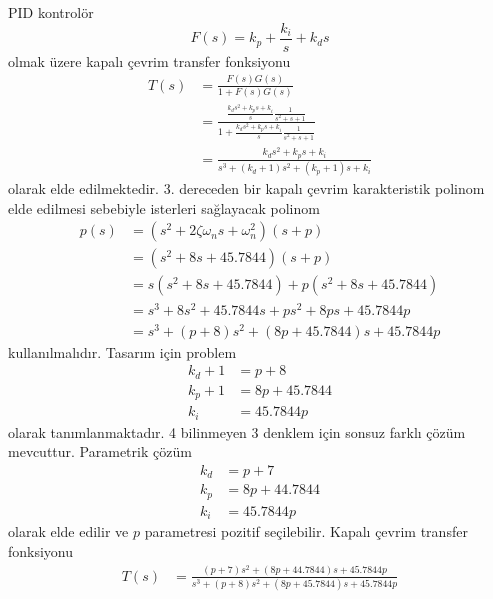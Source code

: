 PID kontrolör
\begin{equation}
    F(s)=k_p+\frac{k_i}{s}+k_d s
\end{equation}
olmak üzere kapalı çevrim transfer fonksiyonu 
\begin{equation}
\begin{split}
    T(s)&=\frac{F(s)G(s)}{1+F(s)G(s)}\\
    &=\frac{\frac{k_ds^2+k_ps+k_i}{s}\frac{1}{s^2+s+1}}{1+\frac{k_ds^2+k_ps+k_i}{s}\frac{1}{s^2+s+1}}\\
    &=\frac{k_ds^2+k_ps+k_i}{s^3+(k_d+1)s^2+(k_p+1)s+k_i}
\end{split}
\end{equation}
olarak elde edilmektedir. 3. dereceden bir kapalı çevrim karakteristik polinom elde edilmesi sebebiyle 
isterleri sağlayacak polinom
\begin{equation}
\begin{split}
    p(s)&=(s^2+2\zeta\omega_n s+\omega_n^2)(s+p)\\
    &=(s^2+8s+45.7844)(s+p)\\
    &=s(s^2+8s+45.7844)+p(s^2+8s+45.7844)\\
    &=s^3+8s^2+45.7844s+ps^2+8ps+45.7844p\\
    &=s^3+(p+8)s^2+(8p+45.7844)s+45.7844p
\end{split}
\end{equation}
kullanılmalıdır.
Tasarım için problem
\begin{equation}
\begin{split}
    k_d+1&=p+8\\
    k_p+1&=8p+45.7844\\
    k_i&=45.7844p
\end{split}
\end{equation}
olarak tanımlanmaktadır. 4 bilinmeyen 3 denklem için sonsuz farklı çözüm mevcuttur. Parametrik çözüm 
\begin{equation}
\begin{split}
    k_d&=p+7\\
    k_p&=8p+44.7844\\
    k_i&=45.7844p
\end{split}
\end{equation}
olarak elde edilir ve $p$ parametresi pozitif seçilebilir. Kapalı çevrim transfer fonksiyonu 
\begin{equation}
\begin{split}
    T(s)&=\frac{(p+7)s^2+(8p+44.7844)s+45.7844p}{s^3+(p+8)s^2+(8p+45.7844)s+45.7844p}
\end{split}
\end{equation}
